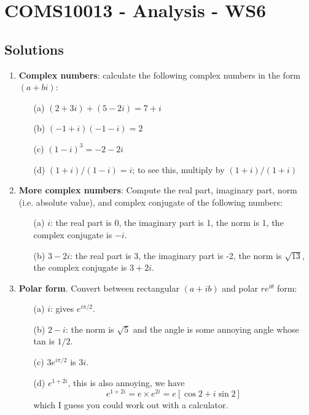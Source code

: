 \documentclass[11pt,a4paper]{scrartcl}
\begin{document}
\section*{COMS10013 - Analysis - WS6}

\subsection*{Solutions}

\begin{enumerate}
\item \textbf{Complex numbers}: calculate the following complex numbers in the form $(a+bi)$: 
	\begin{itemize}
		\item[(a)] $(2+3i) + (5-2i) = 7 + i$
		\item[(b)] $(-1+i)(-1-i) = 2$
		\item[(c)] $(1-i)^3 = -2-2i$
		\item[(d)] $(1+i)/(1-i) = i$; to see this, multiply by $(1+i)/(1+i)$
	\end{itemize}

	\item \textbf{More complex numbers}: Compute the real part, imaginary part, norm (i.e. absolute value), and complex conjugate of the following numbers:
	\begin{itemize}
		\item[(a)] $i$: the real part is 0, the imaginary part is 1, the norm is 1, the complex conjugate is $-i$.
		\item[(b)] $3-2i$: the real part is 3, the imaginary part is -2, the norm is $\sqrt{13}$, the complex conjugate is $3+2i$.
	\end{itemize}
	
	
	\item  \textbf{Polar form}. Convert between rectangular $(a+ib)$ and polar $re^{i\theta}$ form:
	\begin{itemize}
		\item[(a)] $i$: gives $e^{i\pi/2}$.
		\item[(b)] $2-i$: the norm is $\sqrt{5}$ and the angle is some annoying angle whose tan is $1/2$. 
		\item[(c)] $3e^{i\pi/2}$ is $3i$.
		\item[(d)] $e^{1+2i}$, this is also annoying, we have
                  $$e^{1+2i}=e\times e^{2i}=e[\cos{2}+i\sin{2}]$$
                  which I guess you could work out with a calculator.
	\end{itemize}



\end{enumerate}
\end{document}
